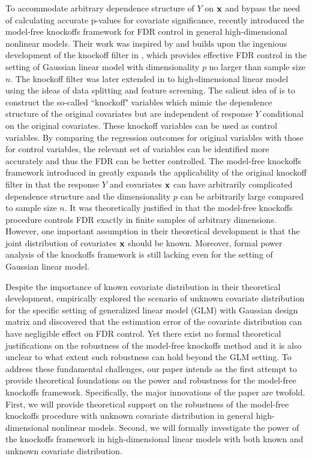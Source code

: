 \documentclass[11pt]{article}
\newcommand{\bx}{\mbox{\bf x}}
\begin{document}
To accommodate arbitrary dependence structure of $Y$ on $\bx$ and bypass the need of calculating accurate p-values for covariate significance, \cite{CandesFanJansonLv2016} recently introduced the model-free knockoffs framework for FDR control in general high-dimensional nonlinear models. Their work was inspired by and builds upon the ingenious development of the knockoff filter in \cite{BarberCandes2015}, which provides effective FDR control in the setting of Gaussian linear model with dimensionality $p$ no larger than sample size $n$. The knockoff filter was later extended in \cite{BarberCandes2016} to high-dimensional linear model using the ideas of data splitting and feature screening. The salient idea of \cite{BarberCandes2015} is to construct the so-called ``knockoff" variables which mimic the dependence structure of the original covariates but are independent of response $Y$ conditional on the original covariates. These knockoff variables can be used as control variables. By comparing the regression outcomes for original variables with those for control variables, the relevant set of variables can be  identified more accurately and thus the FDR can be better controlled. The model-free knockoffs framework introduced in \cite{CandesFanJansonLv2016} greatly expands the applicability of the original knockoff filter in that the response $Y$ and covariates $\bx$ can have arbitrarily complicated dependence structure and the dimensionality $p$ can be arbitrarily large compared to sample size $n$. It was theoretically justified in \cite{CandesFanJansonLv2016} that the model-free knockoffs procedure controls FDR exactly in finite samples of arbitrary dimensions. However, one important assumption in their theoretical development is that the joint distribution of covariates $\bx$ should be known. Moreover, formal power analysis of the knockoffs framework is still lacking even for the setting of Gaussian linear model.

Despite the importance of known covariate distribution in their theoretical development, \cite{CandesFanJansonLv2016} empirically explored the scenario of unknown covariate distribution for the specific setting of generalized linear model (GLM) \cite{McCullaghNelder1989} with Gaussian design matrix and discovered that the estimation error of the covariate distribution can have  negligible effect on FDR control. Yet there exist no formal theoretical justifications on the robustness of the model-free knockoffs method and it is also unclear to what extent such robustness can hold beyond the GLM setting. To address these fundamental challenges, our paper intends as the first attempt to provide theoretical foundations on the power and robustness for the model-free knockoffs framework. Specifically, the major innovations of the paper are twofold. First, we will provide theoretical support on the robustness of the model-free knockoffs procedure with unknown covariate distribution in general high-dimensional nonlinear models. Second, we will formally investigate the power of the knockoffs framework in high-dimensional linear models with both known and unknown covariate distribution.
\end{document}
